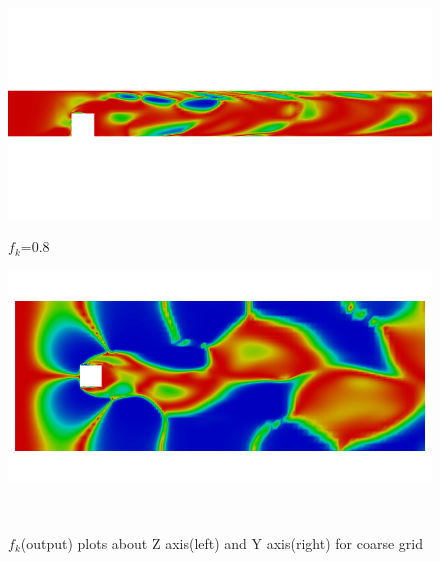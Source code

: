 \begin{figure}[H]
\begin{minipage}[b]{0.5\linewidth}
\includegraphics[scale=0.25]{figure/coarse/eight/fkout_z.png}
\caption*{$f_k$=0.8}
\end{minipage}
\begin{minipage}[b]{0.5\linewidth}
\includegraphics[scale=0.25]{figure/coarse/eight/fkout_y.png}
\caption*{}
\end{minipage}\\
\caption{$f_k$(output) plots about Z axis(left) and Y axis(right) for coarse grid}
\label{fig:eight}
\end{figure}

